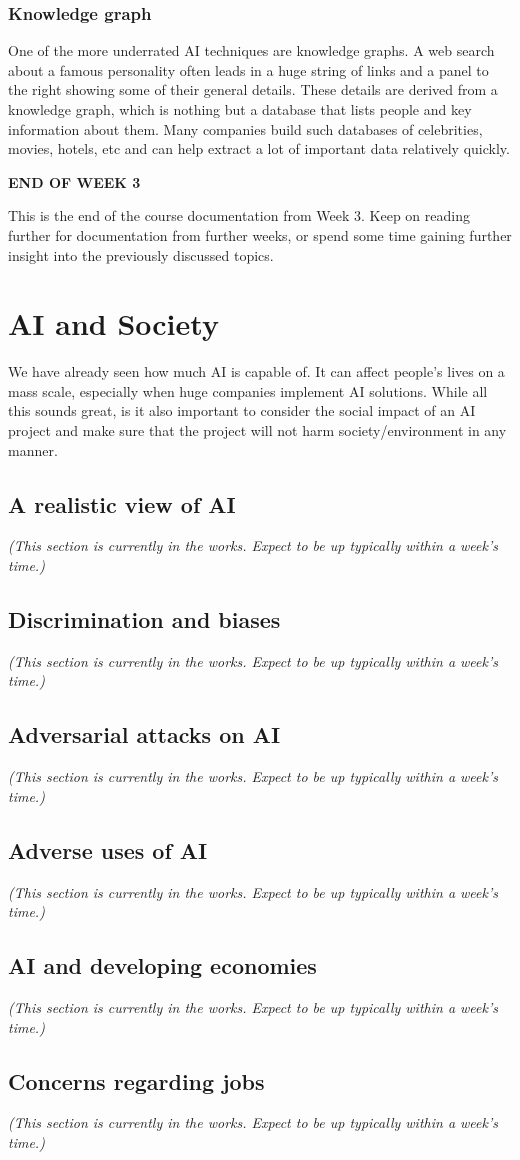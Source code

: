 \documentclass{article}[a4paper,12pt]
\theoremstyle{definition}
\begin{document}
\subsubsection{Knowledge graph}
One of the more underrated AI techniques are knowledge graphs. A web search about a famous personality often leads in a huge string of links and a panel to the right showing some of their general details. These details are derived from a knowledge graph, which is nothing but a database that lists people and key information about them. Many companies build such databases of celebrities, movies, hotels, etc and can help extract a lot of important data relatively quickly.

\hrulefill
\begin{center}
\textbf{END OF WEEK 3}
\end{center}
This is the end of the course documentation from Week 3. Keep on reading further for documentation from further weeks, or spend some time gaining further insight into the previously discussed topics.

\hrulefill
\pagebreak
\section{AI and Society}
We have already seen how much AI is capable of. It can affect people's lives on a mass scale, especially when huge companies implement AI solutions. While all this sounds great, is it also important to consider the social impact of an AI project and make sure that the project will not harm society/environment in any manner.
\subsection{A realistic view of AI}
\textit{(This section is currently in the works. Expect to be up typically within a week's time.)}
\subsection{Discrimination and biases}
\textit{(This section is currently in the works. Expect to be up typically within a week's time.)}
\subsection{Adversarial attacks on AI}
\textit{(This section is currently in the works. Expect to be up typically within a week's time.)}
\subsection{Adverse uses of AI}
\textit{(This section is currently in the works. Expect to be up typically within a week's time.)}
\subsection{AI and developing economies}
\textit{(This section is currently in the works. Expect to be up typically within a week's time.)}
\subsection{Concerns regarding jobs}
\textit{(This section is currently in the works. Expect to be up typically within a week's time.)}

\hrulefill
\end{document}
